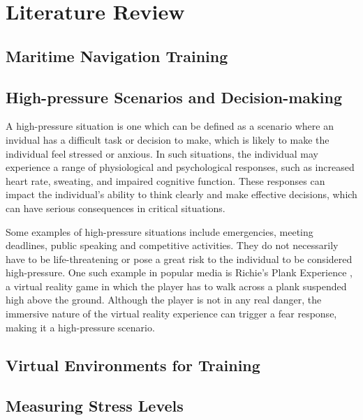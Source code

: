 \documentclass[12pt]{article}
\begin{document}
\section{Literature Review}

\subsection{Maritime Navigation Training}

\subsection{High-pressure Scenarios and Decision-making}

A high-pressure situation is one which can be defined as a scenario where an invidual has a difficult task or decision to make, which is likely to make the individual feel stressed or anxious. In such situations, the individual may experience a range of physiological and psychological responses, such as increased heart rate, sweating, and impaired cognitive function. These responses can impact the individual's ability to think clearly and make effective decisions, which can have serious consequences in critical situations.

Some examples of high-pressure situations include emergencies, meeting deadlines, public speaking and competitive activities. They do not necessarily have to be life-threatening or pose a great risk to the individual to be considered high-pressure. One such example in popular media is Richie's Plank Experience \cite{richiesplankexperience}, a virtual reality game in which the player has to walk across a plank suspended high above the ground. Although the player is not in any real danger, the immersive nature of the virtual reality experience can trigger a fear response, making it a high-pressure scenario.


\cite{el2023walk}







\subsection{Virtual Environments for Training}

\subsection{Measuring Stress Levels}
\end{document}
